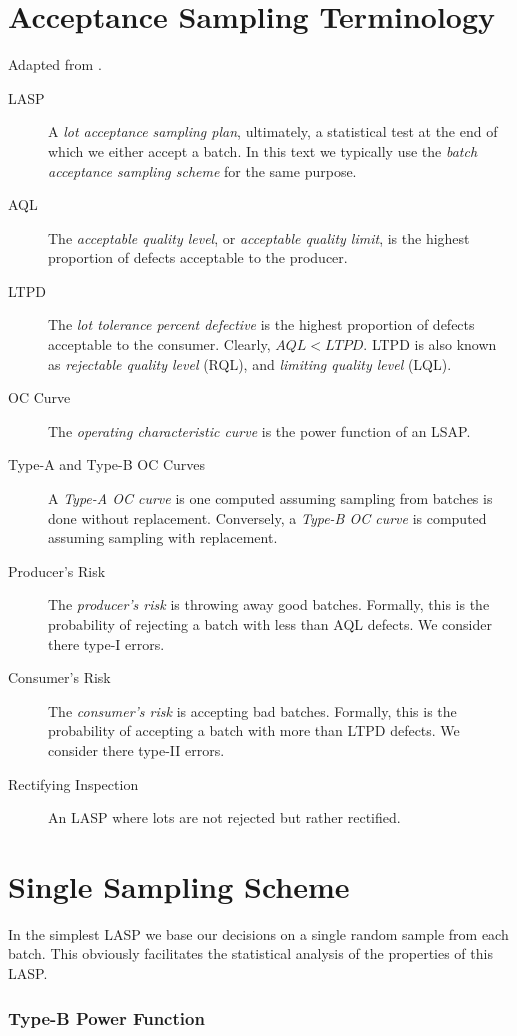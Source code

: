 \section{Acceptance Sampling Terminology}
Adapted from \cite{natrella_nist/sematech_2010}.
\begin{description}
\item [LASP] A \emph{lot acceptance sampling plan}, ultimately, a statistical test at the end of which we either accept a batch. In this text we typically use the \emph{batch acceptance sampling scheme} for the same purpose. 
\item [AQL] The \emph{acceptable quality level}, or \emph{acceptable quality limit}, is the highest proportion of defects acceptable to the producer. 
\item [LTPD] The \emph{lot tolerance percent defective} is the highest proportion of defects acceptable to the consumer. Clearly, $AQL<LTPD$. LTPD is also known as \emph{rejectable quality level} (RQL), and \emph{ limiting quality level} (LQL). 
\item [OC Curve] The \emph{operating characteristic curve} is the power function of an LSAP.
\item [Type-A and Type-B OC Curves] A \emph{Type-A OC curve} is one computed assuming sampling from batches is done without replacement. Conversely, a \emph{Type-B OC curve} is computed assuming sampling with replacement.
\item [Producer's Risk] The \emph{producer's risk} is throwing away good batches. Formally, this is the probability of rejecting a batch with less than AQL defects. We consider there type-I errors.
\item [Consumer's Risk] The \emph{consumer's risk} is accepting bad batches. Formally, this is the probability of accepting a batch with more than LTPD defects. We consider there type-II errors.
\item [Rectifying Inspection] An LASP where lots are not rejected but rather rectified. 
\end{description}



\section{Single Sampling Scheme}
In the simplest LASP we base our decisions on a single random sample from each batch.
This obviously facilitates the statistical analysis of the properties of this LASP.

\subsubsection{Type-B Power Function}

